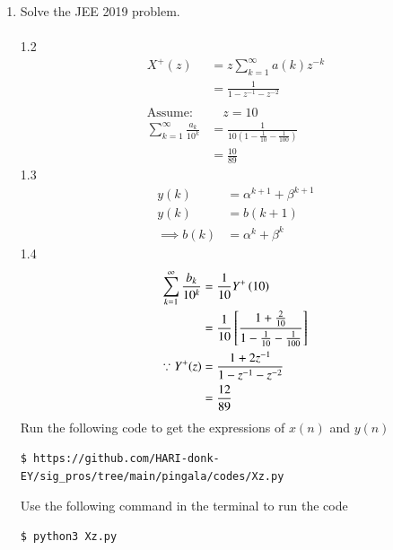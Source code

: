 \documentclass[journal,12pt,twocolumn]{IEEEtran}
\renewcommand\thesection{\arabic{section}}
\begin{document}
\begin{enumerate}[label=\thesection.\arabic*,ref=\thesection.\theenumi]
		\item 
			Solve the JEE 2019 problem.\\
		\solution\\
			1.2\\
			\begin{align}
				X^{+}(z) & =z\sum_{k=1}^{\infty} a(k) z^{-k}\\ & =\frac{1}{1-z^{-1}-z^{-2}}\\ \ \nonumber \\
				\text{Assume:}& \quad z=10\\
				\sum_{k=1}^{\infty} \frac{a_k}{10^k} & =\frac{1}{10 \left(1-\frac{1}{10}-\frac{1}{100}\right)}\\
				&=\frac{10}{89}
			\end{align}
			1.3\\
			\begin{align}
				y(k) & =\alpha^{k+1}+\beta^{k+1}\\
				y(k) & =b(k+1)\\
				\implies b(k) & =\alpha^{k}+\beta^{k}
			\end{align}
			1.4\\
			\begin{align}
				\sum_{k=1}^{\infty}\frac{b_k}{10^k} & = \frac{1}{10}Y^{+}\left({10}\right)\\
				&=\frac{1}{10}\left[\frac{1+\frac{2}{10}}{1-\frac{1}{10}-\frac{1}{100}}\right]\\
				\because Y^{+}(z) & =\frac{1+2z^{-1}}{1-z^{-1}-z^{-2}}\\
				&=\frac{12}{89}
			\end{align}
			Run the following code to get the expressions of $x(n)$ and $y(n)$
			\begin{lstlisting}
$ https://github.com/HARI-donk-EY/sig_pros/tree/main/pingala/codes/Xz.py
			\end{lstlisting}
			Use the following command in the terminal to run the code
			\begin{lstlisting}
$ python3 Xz.py
			\end{lstlisting}

\end{enumerate}
\end{document}
